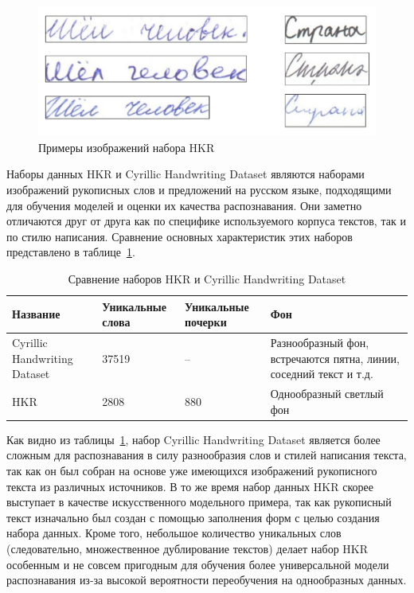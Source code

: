 \begin{figure}[h!]
    \centering
    \includegraphics[width=\textwidth]{img/hkr}
    \caption{Примеры изображений набора HKR}
    \label{fig:hkr-examples}
\end{figure}

Наборы данных HKR и Cyrillic Handwriting Dataset являются наборами изображений рукописных слов и предложений на русском языке,
подходящими для обучения моделей и оценки их качества распознавания.
Они заметно отличаются друг от друга как по специфике используемого корпуса текстов, так и по стилю написания.
Сравнение основных характеристик этих наборов представлено в таблице~\ref{tab:datasets_comparison}.

\begin{table}[h!]
    \centering
    \begin{tabular}{|p{3cm}|p{2.7cm}|p{2.7cm}|p{6cm}|}
        \hline
        \textbf{Название} & \textbf{Уникальные слова} & \textbf{Уникальные почерки} & Фон \\
        \hline
        \hline
        Cyrillic Handwriting Dataset & 37519 & -- & Разнообразный фон, встречаются пятна, линии, соседний текст и т.д.  \\
        \hline
        HKR & 2808 & 880 & Однообразный светлый фон \\
        \hline
    \end{tabular}
    \caption{Сравнение наборов HKR и Cyrillic Handwriting Dataset}
    \label{tab:datasets_comparison}
\end{table}

Как видно из таблицы~\ref{tab:datasets_comparison}, набор Cyrillic Handwriting Dataset является более сложным для распознавания в силу разнообразия
слов и стилей написания текста, так как он был собран на основе уже имеющихся изображений рукописного текста из различных источников.
В то же время набор данных HKR скорее выступает в качестве искусственного модельного примера, так как рукописный текст изначально был
создан с помощью заполнения форм с целью создания набора данных.
Кроме того, небольшое количество уникальных слов (следовательно, множественное дублирование текстов) делает набор HKR особенным и не совсем пригодным для
обучения более универсальной модели распознавания из-за высокой вероятности переобучения на однообразных данных.

